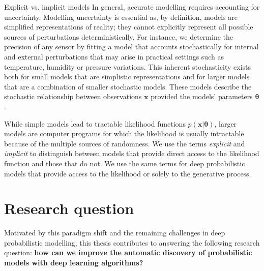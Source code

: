 \begin{side_note}{Explicit vs. implicit models}
  In general, accurate modelling requires accounting for uncertainty. Modelling uncertainty is essential as, by definition, models are simplified representations of reality; they cannot explicitly represent all possible sources of perturbations deterministically.
  For instance, we determine the precision of any sensor by fitting a model that accounts stochastically for internal and external perturbations that may arise in practical settings such as temperature, humidity or pressure variations. This inherent stochasticity exists both for small models that are simplistic representations and for larger models that are a combination of smaller stochastic models. These models describe the stochastic relationship between observations $\mathbf{x}$ provided the models' parameters $\mathbf{\theta}$. %

  While simple models lead to tractable likelihood functions $p(\mathbf{x}|\mathbf{\theta})$, larger models are computer programs for which the likelihood is usually intractable because of the multiple sources of randomness. We use the terms \textit{explicit} and \textit{implicit} to distinguish between models that provide direct access to the likelihood function and those that do not. We use the same terms for deep probabilistic models that provide access to the likelihood or solely to the generative process.
\end{side_note}
\section{Research question}

Motivated by this paradigm shift and the remaining challenges in deep probabilistic modelling, this thesis contributes to answering the following research question: \textbf{how can we improve the automatic discovery of probabilistic models with deep learning algorithms?}

